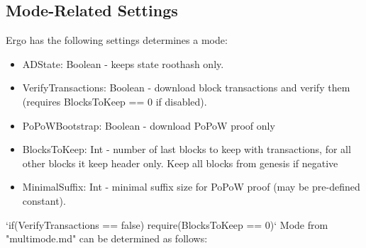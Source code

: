 \documentclass[]{article}   %
\begin{document}
\subsection{Mode-Related Settings}
Ergo has the following settings determines a mode:
\begin{itemize}
\item ADState: Boolean - keeps state roothash only.
\item VerifyTransactions: Boolean - download block transactions and verify them (requires BlocksToKeep == 0 if disabled).
\item PoPoWBootstrap: Boolean - download PoPoW proof only
\item BlocksToKeep: Int - number of last blocks to keep with transactions, for all other blocks it keep header
only. Keep all blocks from genesis if negative
\item MinimalSuffix: Int - minimal suffix size for PoPoW proof (may be pre-defined constant).
\end{itemize}
\par 
‘if(VerifyTransactions == false) require(BlocksToKeep == 0)‘ Mode from "multimode.md" can be determined as follows:


\end{document}
